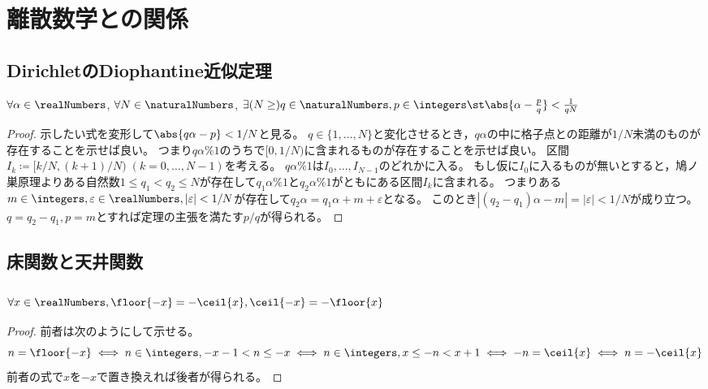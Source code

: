 \chapter{離散数学との関係}
    \section{DirichletのDiophantine近似定理}
        \begin{shadebox}
            $\forall \alpha \in \realNumbers$, $\forall N \in \naturalNumbers$, $\exists (N \geq ) q \in \naturalNumbers, p \in \integers \st \abs{\alpha - \frac{p}{q}} < \frac{1}{qN}$
        \end{shadebox}
        \begin{proof}
            示したい式を変形して$\abs{q\alpha - p} < 1/N$と見る。
            $q\in\{1,\dotsc,N\}$と変化させるとき，$q\alpha$の中に格子点との距離が$1/N$未満のものが存在することを示せば良い。
            つまり$q\alpha\%1$のうちで$[0,1/N)$に含まれるものが存在することを示せば良い。
            区間$I_k \coloneq [k/N,(k+1)/N)\;(k=0,\dotsc,N-1)$を考える。
            $q\alpha\%1$は$I_0,\dotsc,I_{N-1}$のどれかに入る。
            もし仮に$I_0$に入るものが無いとすると，鳩ノ巣原理よりある自然数$1 \leq q_1 < q_2 \leq N$が存在して$q_1\alpha\%1$と$q_2\alpha\%1$がともにある区間$I_k$に含まれる。
            つまりある$m\in\integers,\varepsilon\in\realNumbers,|\varepsilon|<1/N$が存在して$q_2\alpha = q_1\alpha + m + \varepsilon$となる。
            このとき$|(q_2-q_1)\alpha - m|=|\varepsilon|<1/N$が成り立つ。
            $q=q_2-q_1,p=m$とすれば定理の主張を満たす$p/q$が得られる。
        \end{proof}
    \section{床関数と天井関数}
        \subsection{\texorpdfstring{$\forall x\in\realNumbers,\floor{-x} = -\ceil{x},\ceil{-x} = -\floor{x}$}{∀x∈R, floor(-x) = -ceil(x), ceil(-x) = -floor(x)}}
            \begin{proof}
                前者は次のようにして示せる。
                \[ n = \floor{-x} \iff n\in\integers, -x-1 < n \leq -x \iff n\in\integers, x \leq -n < x+1 \iff -n = \ceil{x} \iff n = -\ceil{x} \]
                前者の式で$x$を$-x$で置き換えれば後者が得られる。
            \end{proof}
